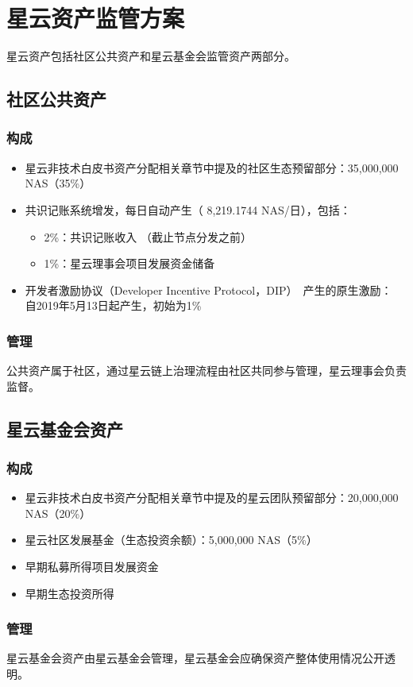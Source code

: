 \section{星云资产监管方案}

星云资产包括社区公共资产和星云基金会监管资产两部分。

\subsection{社区公共资产}

\subsubsection{构成}

\begin{itemize}
	\item 星云非技术白皮书资产分配相关章节中提及的社区生态预留部分：35,000,000 NAS（35\%）
    \item 共识记账系统增发，每日自动产生（ 8,219.1744 NAS/日），包括：
	    \begin{itemize}
			\item 2\%：共识记账收入 （截止节点分发之前）
			\item 1\%：星云理事会项目发展资金储备
		\end{itemize}
	\item 开发者激励协议（Developer Incentive Protocol，DIP）~\cite{mauvepaper}产生的原生激励： 自2019年5月13日起产生，初始为1\%
\end{itemize}

\subsubsection{管理}

公共资产属于社区，通过星云链上治理流程由社区共同参与管理，星云理事会负责监督。

\subsection{星云基金会资产}

\subsubsection{构成}

\begin{itemize}
	\item 星云非技术白皮书资产分配相关章节中提及的星云团队预留部分：20,000,000 NAS（20\%）
    \item 星云社区发展基金（生态投资余额）：5,000,000 NAS（5\%）
	\item 早期私募所得项目发展资金
	\item 早期生态投资所得
\end{itemize}

\subsubsection{管理}

星云基金会资产由星云基金会管理，星云基金会应确保资产整体使用情况公开透明。

